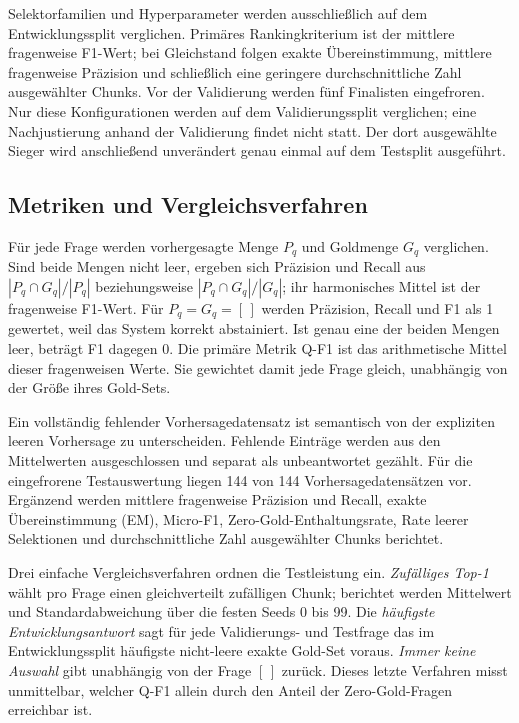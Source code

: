 \documentclass[11pt]{article}
\begin{document}
Selektorfamilien und Hyperparameter werden ausschließlich auf dem Entwicklungssplit verglichen. Primäres Rankingkriterium ist der mittlere fragenweise F1-Wert; bei Gleichstand folgen exakte Übereinstimmung, mittlere fragenweise Präzision und schließlich eine geringere durchschnittliche Zahl ausgewählter Chunks. Vor der Validierung werden fünf Finalisten eingefroren. Nur diese Konfigurationen werden auf dem Validierungssplit verglichen; eine Nachjustierung anhand der Validierung findet nicht statt. Der dort ausgewählte Sieger wird anschließend unverändert genau einmal auf dem Testsplit ausgeführt.

\subsection{Metriken und Vergleichsverfahren}

Für jede Frage werden vorhergesagte Menge $P_q$ und Goldmenge $G_q$ verglichen. Sind beide Mengen nicht leer, ergeben sich Präzision und Recall aus $|P_q\cap G_q|/|P_q|$ beziehungsweise $|P_q\cap G_q|/|G_q|$; ihr harmonisches Mittel ist der fragenweise F1-Wert. Für $P_q=G_q=[\,]$ werden Präzision, Recall und F1 als 1 gewertet, weil das System korrekt abstainiert. Ist genau eine der beiden Mengen leer, beträgt F1 dagegen 0. Die primäre Metrik Q-F1 ist das arithmetische Mittel dieser fragenweisen Werte. Sie gewichtet damit jede Frage gleich, unabhängig von der Größe ihres Gold-Sets.

Ein vollständig fehlender Vorhersagedatensatz ist semantisch von der expliziten leeren Vorhersage zu unterscheiden. Fehlende Einträge werden aus den Mittelwerten ausgeschlossen und separat als unbeantwortet gezählt. Für die eingefrorene Testauswertung liegen 144 von 144 Vorhersagedatensätzen vor. Ergänzend werden mittlere fragenweise Präzision und Recall, exakte Übereinstimmung (EM), Micro-F1, Zero-Gold-Enthaltungsrate, Rate leerer Selektionen und durchschnittliche Zahl ausgewählter Chunks berichtet.

Drei einfache Vergleichsverfahren ordnen die Testleistung ein. \emph{Zufälliges Top-1} wählt pro Frage einen gleichverteilt zufälligen Chunk; berichtet werden Mittelwert und Standardabweichung über die festen Seeds 0 bis 99. Die \emph{häufigste Entwicklungsantwort} sagt für jede Validierungs- und Testfrage das im Entwicklungssplit häufigste nicht-leere exakte Gold-Set voraus. \emph{Immer keine Auswahl} gibt unabhängig von der Frage $[\,]$ zurück. Dieses letzte Verfahren misst unmittelbar, welcher Q-F1 allein durch den Anteil der Zero-Gold-Fragen erreichbar ist.
\end{document}
